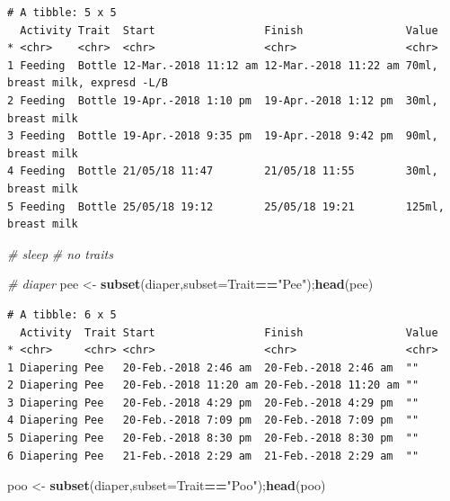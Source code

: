 \documentclass[10,portrait]{article}
\newenvironment{Shaded}{\begin{snugshade}}{\end{snugshade}}
\newcommand{\KeywordTok}[1]{\textcolor[rgb]{0.13,0.29,0.53}{\textbf{#1}}}
\newcommand{\DataTypeTok}[1]{\textcolor[rgb]{0.13,0.29,0.53}{#1}}
\newcommand{\StringTok}[1]{\textcolor[rgb]{0.31,0.60,0.02}{#1}}
\newcommand{\CommentTok}[1]{\textcolor[rgb]{0.56,0.35,0.01}{\textit{#1}}}
\newcommand{\OperatorTok}[1]{\textcolor[rgb]{0.81,0.36,0.00}{\textbf{#1}}}
\newcommand{\NormalTok}[1]{#1}
\begin{document}
\begin{verbatim}
# A tibble: 5 x 5
  Activity Trait  Start                 Finish                Value                          
* <chr>    <chr>  <chr>                 <chr>                 <chr>                          
1 Feeding  Bottle 12-Mar.-2018 11:12 am 12-Mar.-2018 11:22 am 70ml, breast milk, expresd -L/B
2 Feeding  Bottle 19-Apr.-2018 1:10 pm  19-Apr.-2018 1:12 pm  30ml, breast milk              
3 Feeding  Bottle 19-Apr.-2018 9:35 pm  19-Apr.-2018 9:42 pm  90ml, breast milk              
4 Feeding  Bottle 21/05/18 11:47        21/05/18 11:55        30ml, breast milk              
5 Feeding  Bottle 25/05/18 19:12        25/05/18 19:21        125ml, breast milk             
\end{verbatim}

\begin{Shaded}
\begin{Highlighting}[]
\CommentTok{# sleep}
\CommentTok{# no traits}

\CommentTok{# diaper}
\NormalTok{pee <-}\StringTok{ }\KeywordTok{subset}\NormalTok{(diaper,}\DataTypeTok{subset=}\NormalTok{Trait}\OperatorTok{==}\StringTok{"Pee"}\NormalTok{);}\KeywordTok{head}\NormalTok{(pee)}
\end{Highlighting}
\end{Shaded}

\begin{verbatim}
# A tibble: 6 x 5
  Activity  Trait Start                 Finish                Value
* <chr>     <chr> <chr>                 <chr>                 <chr>
1 Diapering Pee   20-Feb.-2018 2:46 am  20-Feb.-2018 2:46 am  ""   
2 Diapering Pee   20-Feb.-2018 11:20 am 20-Feb.-2018 11:20 am ""   
3 Diapering Pee   20-Feb.-2018 4:29 pm  20-Feb.-2018 4:29 pm  ""   
4 Diapering Pee   20-Feb.-2018 7:09 pm  20-Feb.-2018 7:09 pm  ""   
5 Diapering Pee   20-Feb.-2018 8:30 pm  20-Feb.-2018 8:30 pm  ""   
6 Diapering Pee   21-Feb.-2018 2:29 am  21-Feb.-2018 2:29 am  ""   
\end{verbatim}

\begin{Shaded}
\begin{Highlighting}[]
\NormalTok{poo <-}\StringTok{ }\KeywordTok{subset}\NormalTok{(diaper,}\DataTypeTok{subset=}\NormalTok{Trait}\OperatorTok{==}\StringTok{"Poo"}\NormalTok{);}\KeywordTok{head}\NormalTok{(poo) }
\end{Highlighting}
\end{Shaded}
\end{document}
